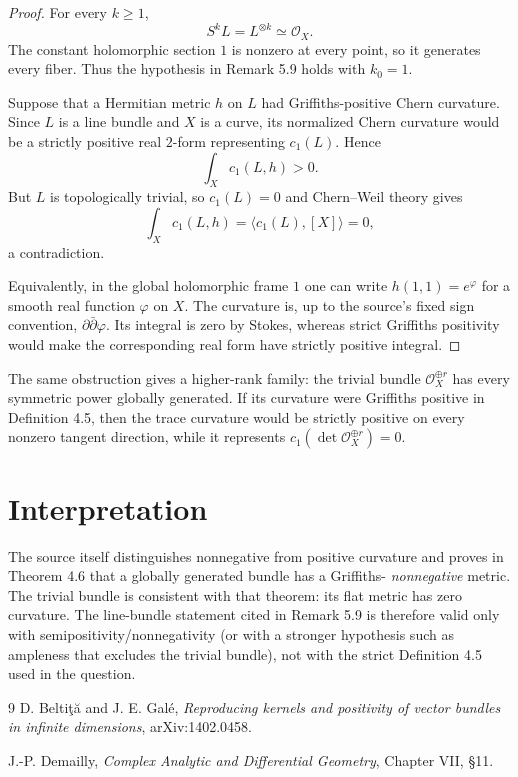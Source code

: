 \documentclass[11pt]{article}
\newcommand{\OO}{\mathcal O}
\begin{document}
\begin{proof}
For every $k\ge1$,
\[
 S^kL=L^{\otimes k}\simeq\OO_X.
\]
The constant holomorphic section $1$ is nonzero at every point, so it generates
every fiber.  Thus the hypothesis in Remark 5.9 holds with $k_0=1$.

Suppose that a Hermitian metric $h$ on $L$ had Griffiths-positive Chern
curvature.  Since $L$ is a line bundle and $X$ is a curve, its normalized Chern
curvature would be a strictly positive real $2$-form representing
$c_1(L)$.  Hence
\[
 \int_X c_1(L,h)>0.
\]
But $L$ is topologically trivial, so $c_1(L)=0$ and Chern--Weil theory gives
\[
 \int_X c_1(L,h)=\langle c_1(L),[X]\rangle=0,
\]
a contradiction.

Equivalently, in the global holomorphic frame $1$ one can write
$h(1,1)=e^{\varphi}$ for a smooth real function $\varphi$ on $X$.  The
curvature is, up to the source's fixed sign convention, $\partial\bar\partial
\varphi$.  Its integral is zero by Stokes, whereas strict Griffiths positivity
would make the corresponding real form have strictly positive integral.
\end{proof}

The same obstruction gives a higher-rank family: the trivial bundle
$\OO_X^{\oplus r}$ has every symmetric power globally generated.  If its
curvature were Griffiths positive in Definition 4.5, then the trace curvature
would be strictly positive on every nonzero tangent direction, while it
represents $c_1(\det\OO_X^{\oplus r})=0$.

\section*{Interpretation}

The source itself distinguishes nonnegative from positive curvature and proves
in Theorem 4.6 that a globally generated bundle has a Griffiths-
\emph{nonnegative} metric.  The trivial bundle is consistent with that theorem:
its flat metric has zero curvature.  The line-bundle statement cited in Remark
5.9 is therefore valid only with semipositivity/nonnegativity (or with a
stronger hypothesis such as ampleness that excludes the trivial bundle), not
with the strict Definition 4.5 used in the question.

\begin{thebibliography}{9}
D. Belti\c{t}\u{a} and J. E. Gal\'{e},
\emph{Reproducing kernels and positivity of vector bundles in infinite
dimensions}, arXiv:1402.0458.

J.-P. Demailly,
\emph{Complex Analytic and Differential Geometry}, Chapter VII, \S11.
\end{thebibliography}
\end{document}
